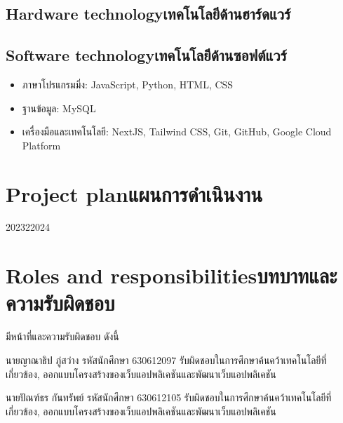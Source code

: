 \subsection{\ifenglish Hardware technology\else เทคโนโลยีด้านฮาร์ดแวร์\fi}

\subsection{\ifenglish Software technology\else เทคโนโลยีด้านซอฟต์แวร์\fi}
\begin{itemize}
    \item ภาษาโปรแกรมมิ่ง: JavaScript, Python, HTML, CSS
    \item ฐานข้อมูล: MySQL
    \item เครื่องมือและเทคโนโลยี: NextJS, Tailwind CSS, Git, GitHub, Google Cloud Platform
\end{itemize}

\section{\ifenglish Project plan\else แผนการดำเนินงาน\fi}

\begin{plan}{6}{2023}{2}{2024}
\end{plan}

\section{\ifenglish Roles and responsibilities\else บทบาทและความรับผิดชอบ\fi}
มีหน้าที่และความรับผิดชอบ ดังนี้


นายญาณาธิป ภู่สว่าง รหัสนักศึกษา 630612097 รับผิดชอบในการศึกษาค้นคว้าเทคโนโลยีที่เกี่ยวข้อง, ออกแบบโครงสร้างของเว็บแอปพลิเคชันและพัฒนาเว็บแอปพลิเคชัน


นายปัณฑ์ธร กันทรัพย์ รหัสนักศึกษา 630612105 รับผิดชอบในการศึกษาค้นคว้าเทคโนโลยีที่เกี่ยวข้อง, ออกแบบโครงสร้างของเว็บแอปพลิเคชันและพัฒนาเว็บแอปพลิเคชัน




